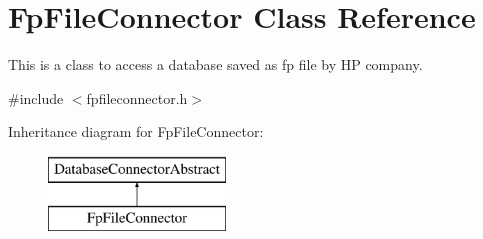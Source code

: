 \hypertarget{classFpFileConnector}{}\section{Fp\+File\+Connector Class Reference}
\label{classFpFileConnector}


This is a class to access a database saved as fp file by HP company.  




{\ttfamily \#include $<$fpfileconnector.\+h$>$}

Inheritance diagram for Fp\+File\+Connector\+:\begin{figure}[H]
\begin{center}
\leavevmode
\includegraphics[height=2.000000cm]{classFpFileConnector}
\end{center}
\end{figure}
